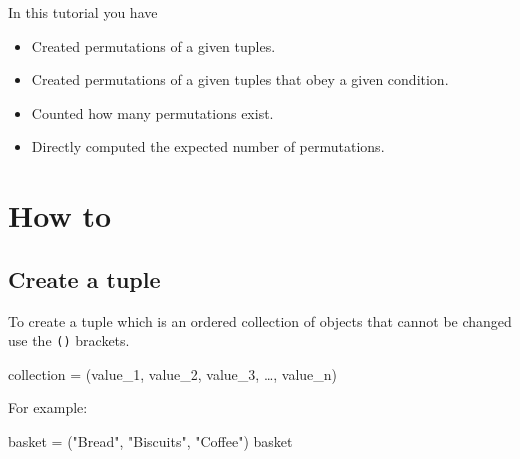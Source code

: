 \begin{note}
In this tutorial you have
\begin{itemize}
\item 

Created permutations of a given tuples.

\item 

Created permutations of a given tuples that obey a given condition.

\item 

Counted how many permutations exist.

\item 

Directly computed the expected number of permutations.

\end{itemize}
\end{note}





\section{How to}
\label{\detokenize{tools-for-mathematics/05-combinations-permutations/how/main:how}}\label{\detokenize{tools-for-mathematics/05-combinations-permutations/how/main::doc}}

\subsection{Create a tuple}
\label{\detokenize{tools-for-mathematics/05-combinations-permutations/how/main:create-a-tuple}}\label{\detokenize{tools-for-mathematics/05-combinations-permutations/how/main:id1}}

To create a tuple which is an ordered collection of objects that cannot be
changed use the \texttt{()} brackets.


\begin{pyin}
collection = (value_1, value_2, value_3, …, value_n)
\end{pyin}



For example:




\begin{pyin}
basket = ("Bread", "Biscuits", "Coffee")
basket
\end{pyin}





